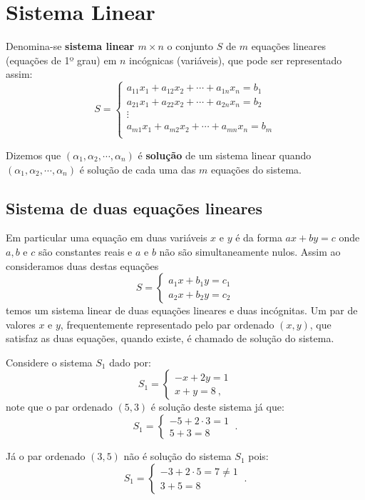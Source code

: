 \chapter{Sistema Linear}

Denomina-se \textbf{sistema linear $m \times n$} o conjunto $S$ de $m$ equações lineares (equações de 1º grau) em $n$ incógnicas (variáveis), que pode ser representado assim:
\[S= \begin{cases}
      a_{11}x_1 + a_{12}x_2 + \cdots + a_{1n}x_n = b_1 \\
      a_{21}x_1 + a_{22}x_2 + \cdots + a_{2n}x_n = b_2 \\
      \vdots \\
      a_{m1}x_1 + a_{m2}x_2 + \cdots + a_{mn}x_n = b_m \\
     \end{cases} \]

Dizemos que $(\alpha_1, \alpha_2, \cdots, \alpha_n)$ é \textbf{solução} de um sistema linear quando $(\alpha_1, \alpha_2, \cdots, \alpha_n)$ é solução de cada uma das $m$ equações do sistema.

\section{Sistema de duas equações lineares}

\vskip0.3cm
 \colorbox{azul}{
 \begin{minipage}{14.5cm}

  Em particular uma equação em duas variáveis $x$ e $y$ é da forma $ax + by= c$ onde $a, b$ e $c$ são constantes reais e $a$ e $b$ não são simultaneamente nulos. Assim ao consideramos duas destas equações
  \[S= \begin{cases}
      a_1x + b_1y= c_1 \\
      a_2x + b_2y= c_2
     \end{cases}\]
 temos um sistema linear de duas equações lineares e duas incógnitas. Um par de valores $x$ e $y$, frequentemente representado pelo par ordenado $(x, y)$, que satisfaz as duas equações, quando existe, é chamado de solução do sistema.

 \end{minipage}}
 \vskip0.3cm

\begin{exem}
 Considere o sistema $S_1$ dado por:
 \[S_1= \begin{cases}
      -x + 2y= 1 \\
      x + y= 8 \ ,
     \end{cases}\]
 note que o par ordenado $(5, 3)$ é solução deste sistema já que:
 \[S_1= \begin{cases}
      -5 + 2 \cdot 3= 1 \\
      5 + 3= 8
     \end{cases} \ .\]

Já o par ordenado $(3, 5)$ não é solução do sistema $S_1$ pois:
\[S_1= \begin{cases}
      -3 + 2 \cdot 5= 7 \neq 1 \\
      3 + 5= 8
     \end{cases} \ .\]
\end{exem}

